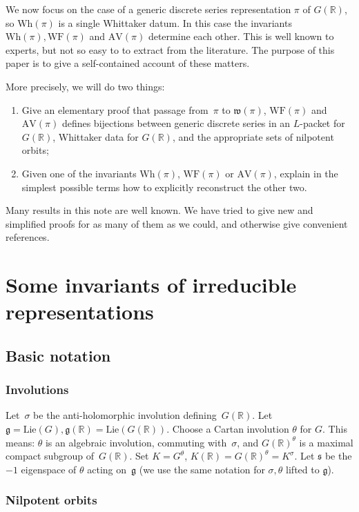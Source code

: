 \documentclass[10pt,leqno]{article}
\newcommand{\R}{\mathbb R}
\newcommand{\Lie}{\mathrm{Lie}}
\newcommand{\g}{\mathfrak g}
\newcommand{\s}{\mathfrak s}
\newcommand{\AV}{\mathrm{AV}}
\newcommand{\Wh}{\mathrm{Wh}}
\newcommand{\WF}{\mathrm{WF}}
\begin{document}
We now focus on the case of a generic discrete series representation
$\pi$ of $G(\R)$, so $\Wh(\pi)$ is a single Whittaker datum.  In this
case the invariants $\Wh(\pi), \WF(\pi)$ and $\AV(\pi)$ determine each
other. This is well known to experts, but not so easy to to extract
from the literature. The purpose
of this paper is to give a self-contained account of these matters.

More precisely, we will do two things:
\begin{enumerate}
\item Give an elementary proof that  passage from~$\pi$ to $\mathfrak{w}(\pi)$, $\WF(\pi)$ and $\AV(\pi)$ defines bijections between generic discrete series in an $L$-packet for $G(\R)$, Whittaker data for $G(\R)$, and the appropriate sets of nilpotent orbits;
\item Given one of the invariants $\Wh(\pi)$, $\WF(\pi)$ or $\AV(\pi)$, explain in the simplest possible terms how to explicitly reconstruct the other two.
\end{enumerate}
Many results in this note are well known. We have tried to give new and simplified proofs for as many of them as we could, and otherwise give convenient references.

\section{Some invariants of irreducible representations}

\subsection{Basic notation}

\subsubsection*{Involutions} 


Let~$\sigma$ be the anti-holomorphic involution defining~$G(\R)$.
Let $\g=\Lie(G), \g(\R)=\Lie(G(\R))$. 
Choose a Cartan involution $\theta$ for $G$. This means:
$\theta$ is an algebraic involution, commuting with~$\sigma$,
and $G(\R)^\theta$ is a maximal compact subgroup of~$G(\R)$. Set $K=G^\theta$, $K(\R)=G(\R)^\theta=K^\sigma$.
Let $\s$ be the $-1$ eigenspace of $\theta$ acting on~$\g$
(we use the same notation for $\sigma,\theta$ lifted to $\g$). 

\subsubsection*{Nilpotent orbits} 
\end{document}
